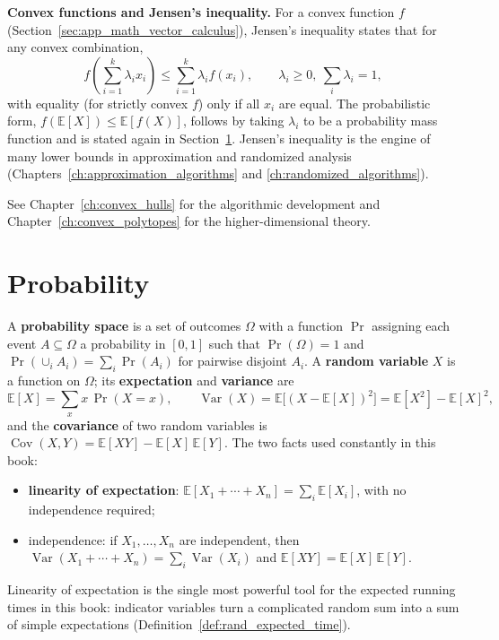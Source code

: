 \medskip
\noindent\textbf{Convex functions and Jensen's inequality.}
For a convex function $f$ (Section~\ref{sec:app_math_vector_calculus}),
Jensen's inequality states that for any convex combination,
\[
  f\left( \sum_{i=1}^k \lambda_i x_i \right) \le \sum_{i=1}^k \lambda_i f(x_i),
  \qquad \lambda_i \ge 0,\ \sum_i \lambda_i = 1,
\]
with equality (for strictly convex $f$) only if all $x_i$ are equal. The
probabilistic form, $f(\mathbb{E}[X]) \le \mathbb{E}[f(X)]$, follows by
taking $\lambda_i$ to be a probability mass function and is stated again in
Section~\ref{sec:app_math_probability}. Jensen's inequality is the engine of
many lower bounds in approximation and randomized analysis
(Chapters~\ref{ch:approximation_algorithms} and \ref{ch:randomized_algorithms}).

See Chapter~\ref{ch:convex_hulls} for the algorithmic development and
Chapter~\ref{ch:convex_polytopes} for the higher-dimensional theory.

\section{Probability}
\label{sec:app_math_probability}

A \textbf{probability space} is a set of outcomes $\Omega$ with a function
$\Pr$ assigning each event $A \subseteq \Omega$ a probability in $[0,1]$ such
that $\Pr(\Omega) = 1$ and $\Pr(\cup_i A_i) = \sum_i \Pr(A_i)$ for pairwise
disjoint $A_i$. A \textbf{random variable} $X$ is a function on $\Omega$;
its \textbf{expectation} and \textbf{variance} are
\[
  \mathbb{E}[X] = \sum_x x\,\Pr(X = x),
  \qquad
  \operatorname{Var}(X) = \mathbb{E}\bigl[(X - \mathbb{E}[X])^2\bigr]
    = \mathbb{E}[X^2] - \mathbb{E}[X]^2,
\]
and the \textbf{covariance} of two random variables is
$\operatorname{Cov}(X,Y) = \mathbb{E}[XY] - \mathbb{E}[X]\,\mathbb{E}[Y]$.
The two facts used constantly in this book:
\begin{itemize}
  \item \textbf{linearity of expectation}:
    $\mathbb{E}[X_1 + \cdots + X_n] = \sum_i \mathbb{E}[X_i]$, with no
    independence required;
  \item independence: if $X_1,\dots,X_n$ are independent, then
    $\operatorname{Var}(X_1 + \cdots + X_n) = \sum_i \operatorname{Var}(X_i)$
    and $\mathbb{E}[XY] = \mathbb{E}[X]\,\mathbb{E}[Y]$.
\end{itemize}
Linearity of expectation is the single most powerful tool for the expected
running times in this book: indicator variables turn a complicated random
sum into a sum of simple expectations (Definition~\ref{def:rand_expected_time}).

